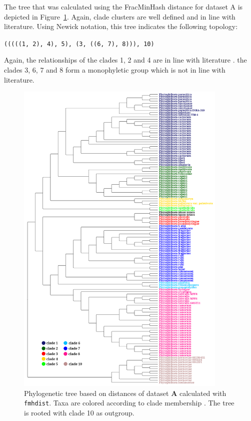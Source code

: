 The tree that was calculated using the FracMinHash distance for dataset A is
depicted in Figure~\ref{fig:mandalFmhdistTree}. Again, clade clusters are well
defined and in line with literature.
Using Newick notation, this tree indicates the following topology:

\texttt{(((((1, 2), 4), 5), (3, ((6, 7), 8))), 10)}

Again, the relationships of the clades 1, 2 and 4 are in line with literature
\cite{abadPhytophthoraTaxonomicPhylogenetic2023a,yangExpandedPhylogenyGenus2017}.
the clades 3, 6, 7 and 8 form a monophyletic group which is not in line with
literature.

\begin{figure}
  \centering
  \includegraphics[width=0.9\textwidth]{figures/fmhdist_mandal_tree_k21_s2000.png}
  \caption[Phylogenetic tree based on distances of dataset \textbf{A} calculated
  with \texttt{fmhdist}]{Phylogenetic tree based on distances of dataset
  \textbf{A} calculated with \texttt{fmhdist}. Taxa are colored according to
  clade membership \cite{abadPhytophthoraTaxonomicPhylogenetic2023a}. The tree
  is rooted with clade 10 as outgroup.}
  \label{fig:mandalFmhdistTree}
\end{figure}

